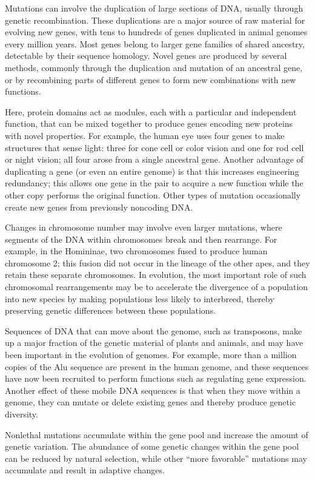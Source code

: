 Mutations can involve the duplication of large sections of DNA, usually through genetic recombination. These duplications are a major source of raw material for evolving new genes, with tens to hundreds of genes duplicated in animal genomes every million years. Most genes belong to larger gene families of shared ancestry, detectable by their sequence homology. Novel genes are produced by several methods, commonly through the duplication and mutation of an ancestral gene, or by recombining parts of different genes to form new combinations with new functions.

Here, protein domains act as modules, each with a particular and independent function, that can be mixed together to produce genes encoding new proteins with novel properties. For example, the human eye uses four genes to make structures that sense light: three for cone cell or color vision and one for rod cell or night vision; all four arose from a single ancestral gene. Another advantage of duplicating a gene (or even an entire genome) is that this increases engineering redundancy; this allows one gene in the pair to acquire a new function while the other copy performs the original function. Other types of mutation occasionally create new genes from previously noncoding DNA.

Changes in chromosome number may involve even larger mutations, where segments of the DNA within chromosomes break and then rearrange. For example, in the Homininae, two chromosomes fused to produce human chromosome 2; this fusion did not occur in the lineage of the other apes, and they retain these separate chromosomes. In evolution, the most important role of such chromosomal rearrangements may be to accelerate the divergence of a population into new species by making populations less likely to interbreed, thereby preserving genetic differences between these populations.

Sequences of DNA that can move about the genome, such as transposons, make up a major fraction of the genetic material of plants and animals, and may have been important in the evolution of genomes. For example, more than a million copies of the Alu sequence are present in the human genome, and these sequences have now been recruited to perform functions such as regulating gene expression. Another effect of these mobile DNA sequences is that when they move within a genome, they can mutate or delete existing genes and thereby produce genetic diversity.

Nonlethal mutations accumulate within the gene pool and increase the amount of genetic variation. The abundance of some genetic changes within the gene pool can be reduced by natural selection, while other ``more favorable'' mutations may accumulate and result in adaptive changes.

